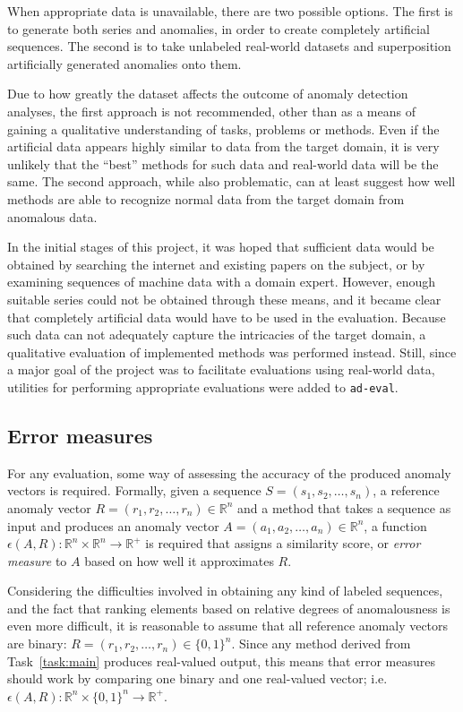 When appropriate data is unavailable, there are two possible options. The first is to generate both series and anomalies, in order to create completely artificial sequences. The second is to take unlabeled real-world datasets and superposition artificially generated anomalies onto them.

Due to how greatly the dataset affects the outcome of anomaly detection analyses, the first approach is not recommended, other than as a means of gaining a qualitative understanding of tasks, problems or methods. Even if the artificial data appears highly similar to data from the target domain, it is very unlikely that the ``best'' methods for such data and real-world data will be the same. The second approach, while also problematic, can at least suggest how well methods are able to recognize normal data from the target domain from anomalous data.

In the initial stages of this project, it was hoped that sufficient data would be obtained by searching the internet and existing papers on the subject, or by examining sequences of machine data with a domain expert. However, enough suitable series could not be obtained through these means, and it became clear that completely artificial data would have to be used in the evaluation. Because such data can not adequately capture the intricacies of the target domain, a qualitative evaluation of implemented methods was performed instead. Still, since a major goal of the project was to facilitate evaluations using real-world data, utilities for performing appropriate evaluations were added to \texttt{ad-eval}.
 
\subsection{Error measures}
\label{sect:evaluation_measures}

For any evaluation, some way of assessing the accuracy of the produced anomaly vectors is required. Formally, given a sequence $S = (s_1, s_2, \dots, s_n)$, a reference anomaly vector $R = (r_1, r_2, \dots, r_n) \in \mathbb{R}^{n}$ and a method that takes a sequence as input and produces an anomaly vector $A = (a_1, a_2, \dots, a_n) \in \mathbb{R}^{n}$, a function $\epsilon(A, R): \mathbb{R}^n \times \mathbb{R}^n \rightarrow \mathbb{R}^+$ is required that assigns a similarity score, or \emph{error measure} to $A$ based on how well it approximates $R$.

Considering the difficulties involved in obtaining any kind of labeled sequences, and the fact that ranking elements based on relative degrees of anomalousness is even more difficult, it is reasonable to assume that all reference anomaly vectors are binary: $R = (r_1, r_2, \dots, r_n) \in {\{0,1\}}^n$. Since any method derived from Task~\ref{task:main} produces real-valued output, this means that error measures should work by comparing one binary and one real-valued vector; i.e.\ $\epsilon{(A, R)}: \mathbb{R}^{n} \times {\{0,1\}}^n \rightarrow \mathbb{R}^+$.

